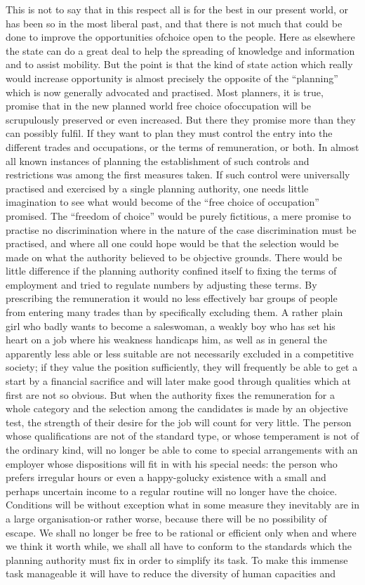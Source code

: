 \documentclass[11pt,openany]{book}
\begin{document}
This is not to say that in this respect all is for the best in our present world, or has been so in the most liberal past, and that there is not much that could be done to improve the opportunities ofchoice open to the people. Here as elsewhere the state can do a great deal to help the spreading of knowledge and information and to assist mobility. But the point is that the kind of state action which really would increase opportunity is almost precisely the opposite of the ``planning'' which is now generally advocated and practised. Most planners, it is true, promise that in the new planned world free choice ofoccupation will be scrupulously preserved or even increased. But there they promise more than they can possibly fulfil. If they want to plan they must control the entry into the different trades and occupations, or the terms of remuneration, or both. In almost all known instances of planning the establishment of such controls and restrictions was among the first measures taken. If such control were universally practised and exercised by a single planning authority, one needs little imagination to see what would become of the ``free choice of occupation'' promised. The ``freedom of choice'' would be purely fictitious, a mere promise to practise no discrimination where in the nature of the case discrimination must be practised, and where all one could hope would be that the selection would be made on what the authority believed to be objective grounds. There would be little difference if the planning authority confined itself to fixing the terms of employment and tried to regulate numbers by adjusting these terms. By prescribing the remuneration it would no less effectively bar groups of people from entering many trades than by specifically excluding them. A rather plain girl who badly wants to become a saleswoman, a weakly boy who has set his heart on a job where his weakness handicaps him, as well as in general the apparently less able or less suitable are not necessarily excluded in a competitive society; if they value the position sufficiently, they will frequently be able to get a start by a financial sacrifice and will later make good through qualities which at first are not so obvious. But when the authority fixes the remuneration for a whole category and the selection among the candidates is made by an objective test, the strength of their desire for the job will count for very little. The person whose qualifications are not of the standard type, or whose temperament is not of the ordinary kind, will no longer be able to come to special arrangements with an employer whose dispositions will fit in with his special needs: the person who prefers irregular hours or even a happy-golucky existence with a small and perhaps uncertain income to a regular routine will no longer have the choice. Conditions will be without exception what in some measure they inevitably are in a large organisation-or rather worse, because there will be no possibility of escape. We shall no longer be free to be rational or efficient only when and where we think it worth while, we shall all have to conform to the standards which the planning authority must fix in order to simplify its task. To make this immense task manageable it will have to reduce the diversity of human capacities and 
\end{document}
